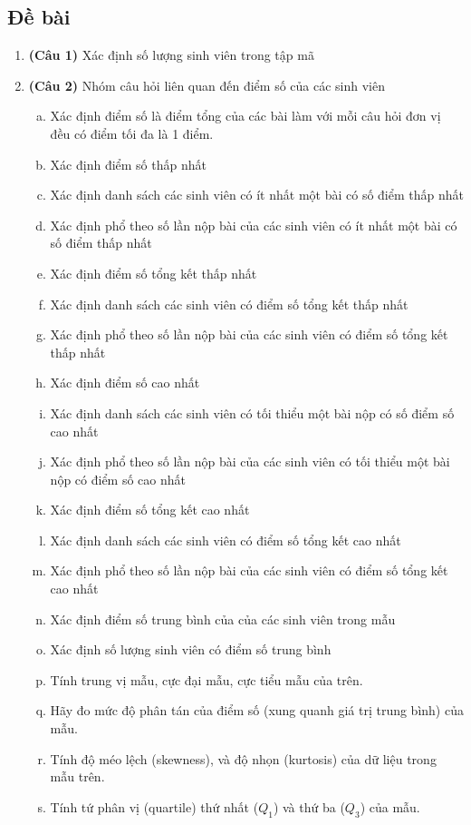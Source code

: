 \documentclass[12pt,a4paper]{article}  %
\begin{document}
\subsection{Đề bài}
\begin{enumerate}
\item {\textbf{(Câu 1)} Xác định số lượng sinh viên trong tập mã}
    
\item {\textbf{(Câu 2)} Nhóm câu hỏi liên quan đến điểm số của các sinh viên }
\begin{enumerate}[a)]
  \item {Xác định điểm số là điểm tổng của các bài làm với mỗi câu hỏi đơn vị đều có điểm tối đa là 1 điểm.}

  \item {Xác định điểm số thấp nhất}
  \item {Xác định danh sách các sinh viên có ít nhất một bài có số điểm thấp nhất}
  \item {Xác định phổ theo số lần nộp bài của các sinh viên có ít nhất một bài có số điểm thấp nhất}
    
  \item {Xác định điểm số tổng kết thấp nhất}
  \item {Xác định danh sách các sinh viên có điểm số tổng kết thấp nhất}
  \item {Xác định phổ theo số lần nộp bài của các sinh viên có điểm số tổng kết thấp nhất}
    
  \item {Xác định điểm số cao nhất}
  \item {Xác định danh sách các sinh viên có tối thiểu một bài nộp có số điểm số cao nhất}
  \item {Xác định phổ theo số lần nộp bài của các sinh viên có tối thiểu một bài nộp có điểm số cao nhất}
    
  \item {Xác định điểm số tổng kết cao nhất}
  \item {Xác định danh sách các sinh viên có điểm số tổng kết cao nhất}
  \item {Xác định phổ theo số lần nộp bài của các sinh viên có điểm số tổng kết cao nhất}
  
  \item Xác định điểm số trung bình của của các sinh viên trong mẫu
  \item Xác định số lượng sinh viên có điểm số trung bình 
  \item Tính trung vị mẫu, cực đại mẫu, cực tiểu mẫu của trên.
  \item Hãy đo mức độ phân tán của điểm số (xung quanh giá trị trung bình) của  mẫu.
  \item Tính độ méo lệch (skewness), và độ nhọn (kurtosis) của dữ liệu trong mẫu trên.
  \item Tính tứ phân vị (quartile) thứ nhất ($Q_1$) và thứ ba ($Q_3$) của mẫu.
  

\end{enumerate}
\end{enumerate}
\end{document}
